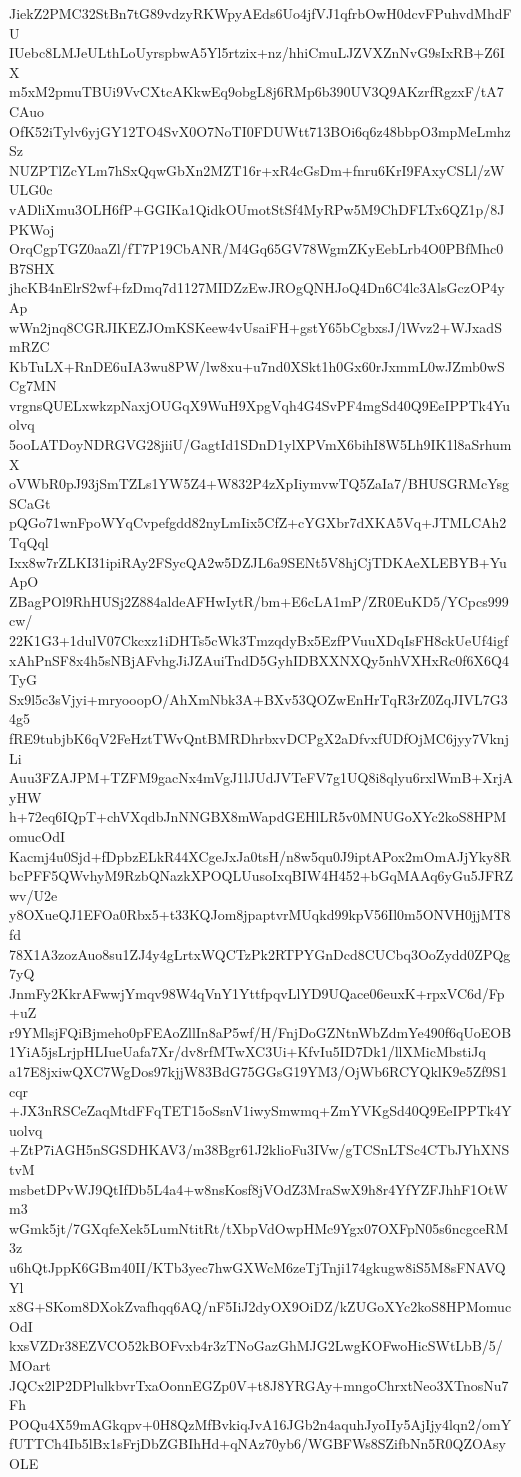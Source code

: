 JiekZ2PMC32StBn7tG89vdzyRKWpyAEds6Uo4jfVJ1qfrbOwH0dcvFPuhvdMhdFU
IUebc8LMJeULthLoUyrspbwA5Yl5rtzix+nz/hhiCmuLJZVXZnNvG9sIxRB+Z6IX
m5xM2pmuTBUi9VvCXtcAKkwEq9obgL8j6RMp6b390UV3Q9AKzrfRgzxF/tA7CAuo
OfK52iTylv6yjGY12TO4SvX0O7NoTI0FDUWtt713BOi6q6z48bbpO3mpMeLmhzSz
NUZPTlZcYLm7hSxQqwGbXn2MZT16r+xR4cGsDm+fnru6KrI9FAxyCSLl/zWULG0c
vADliXmu3OLH6fP+GGIKa1QidkOUmotStSf4MyRPw5M9ChDFLTx6QZ1p/8JPKWoj
OrqCgpTGZ0aaZl/fT7P19CbANR/M4Gq65GV78WgmZKyEebLrb4O0PBfMhc0B7SHX
jhcKB4nElrS2wf+fzDmq7d1127MIDZzEwJROgQNHJoQ4Dn6C4lc3AlsGczOP4yAp
wWn2jnq8CGRJIKEZJOmKSKeew4vUsaiFH+gstY65bCgbxsJ/lWvz2+WJxadSmRZC
KbTuLX+RnDE6uIA3wu8PW/lw8xu+u7nd0XSkt1h0Gx60rJxmmL0wJZmb0wSCg7MN
vrgnsQUELxwkzpNaxjOUGqX9WuH9XpgVqh4G4SvPF4mgSd40Q9EeIPPTk4Yuolvq
5ooLATDoyNDRGVG28jiiU/GagtId1SDnD1ylXPVmX6bihI8W5Lh9IK1l8aSrhumX
oVWbR0pJ93jSmTZLs1YW5Z4+W832P4zXpIiymvwTQ5ZaIa7/BHUSGRMcYsgSCaGt
pQGo71wnFpoWYqCvpefgdd82nyLmIix5CfZ+cYGXbr7dXKA5Vq+JTMLCAh2TqQql
Ixx8w7rZLKI31ipiRAy2FSycQA2w5DZJL6a9SENt5V8hjCjTDKAeXLEBYB+YuApO
ZBagPOl9RhHUSj2Z884aldeAFHwIytR/bm+E6cLA1mP/ZR0EuKD5/YCpcs999cw/
22K1G3+1dulV07Ckcxz1iDHTs5cWk3TmzqdyBx5EzfPVuuXDqIsFH8ckUeUf4igf
xAhPnSF8x4h5sNBjAFvhgJiJZAuiTndD5GyhIDBXXNXQy5nhVXHxRc0f6X6Q4TyG
Sx9l5c3sVjyi+mryooopO/AhXmNbk3A+BXv53QOZwEnHrTqR3rZ0ZqJIVL7G34g5
fRE9tubjbK6qV2FeHztTWvQntBMRDhrbxvDCPgX2aDfvxfUDfOjMC6jyy7VknjLi
Auu3FZAJPM+TZFM9gacNx4mVgJ1lJUdJVTeFV7g1UQ8i8qlyu6rxlWmB+XrjAyHW
h+72eq6IQpT+chVXqdbJnNNGBX8mWapdGEHlLR5v0MNUGoXYc2koS8HPMomucOdI
Kacmj4u0Sjd+fDpbzELkR44XCgeJxJa0tsH/n8w5qu0J9iptAPox2mOmAJjYky8R
bcPFF5QWvhyM9RzbQNazkXPOQLUusoIxqBIW4H452+bGqMAAq6yGu5JFRZwv/U2e
y8OXueQJ1EFOa0Rbx5+t33KQJom8jpaptvrMUqkd99kpV56Il0m5ONVH0jjMT8fd
78X1A3zozAuo8su1ZJ4y4gLrtxWQCTzPk2RTPYGnDcd8CUCbq3OoZydd0ZPQg7yQ
JnmFy2KkrAFwwjYmqv98W4qVnY1YttfpqvLlYD9UQace06euxK+rpxVC6d/Fp+uZ
r9YMlsjFQiBjmeho0pFEAoZllIn8aP5wf/H/FnjDoGZNtnWbZdmYe490f6qUoEOB
1YiA5jsLrjpHLIueUafa7Xr/dv8rfMTwXC3Ui+KfvIu5ID7Dk1/llXMicMbstiJq
a17E8jxiwQXC7WgDos97kjjW83BdG75GGsG19YM3/OjWb6RCYQklK9e5Zf9S1cqr
+JX3nRSCeZaqMtdFFqTET15oSsnV1iwySmwmq+ZmYVKgSd40Q9EeIPPTk4Yuolvq
+ZtP7iAGH5nSGSDHKAV3/m38Bgr61J2klioFu3IVw/gTCSnLTSc4CTbJYhXNStvM
msbetDPvWJ9QtIfDb5L4a4+w8nsKosf8jVOdZ3MraSwX9h8r4YfYZFJhhF1OtWm3
wGmk5jt/7GXqfeXek5LumNtitRt/tXbpVdOwpHMc9Ygx07OXFpN05s6ncgceRM3z
u6hQtJppK6GBm40II/KTb3yec7hwGXWcM6zeTjTnji174gkugw8iS5M8sFNAVQYl
x8G+SKom8DXokZvafhqq6AQ/nF5IiJ2dyOX9OiDZ/kZUGoXYc2koS8HPMomucOdI
kxsVZDr38EZVCO52kBOFvxb4r3zTNoGazGhMJG2LwgKOFwoHicSWtLbB/5/MOart
JQCx2lP2DPlulkbvrTxaOonnEGZp0V+t8J8YRGAy+mngoChrxtNeo3XTnosNu7Fh
POQu4X59mAGkqpv+0H8QzMfBvkiqJvA16JGb2n4aquhJyoIIy5AjIjy4lqn2/omY
fUTTCh4Ib5lBx1sFrjDbZGBIhHd+qNAz70yb6/WGBFWs8SZifbNn5R0QZOAsyOLE
